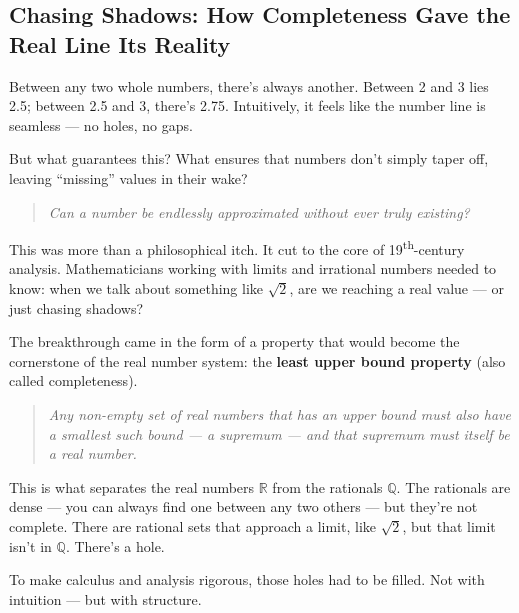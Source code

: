 \subsection{Chasing Shadows: How Completeness Gave the Real Line Its Reality}

Between any two whole numbers, there’s always another. Between 2 and 3 lies 2.5; between 2.5 and 3, there’s 2.75. Intuitively, it feels like the number line is seamless — no holes, no gaps.

But what guarantees this? What ensures that numbers don’t simply taper off, leaving “missing” values in their wake?

\medskip

\begin{quote}
    \textit{Can a number be endlessly approximated without ever truly existing?}
\end{quote}

This was more than a philosophical itch. It cut to the core of 19\textsuperscript{th}-century analysis. Mathematicians working with limits and irrational numbers needed to know: when we talk about something like \( \sqrt{2} \), are we reaching a real value — or just chasing shadows?

\medskip

The breakthrough came in the form of a property that would become the cornerstone of the real number system: the \textbf{least upper bound property} (also called completeness).

\begin{quote}
\textit{Any non-empty set of real numbers that has an upper bound must also have a smallest such bound — a supremum — and that supremum must itself be a real number.}
\end{quote}

This is what separates the real numbers \( \mathbb{R} \) from the rationals \( \mathbb{Q} \). The rationals are dense — you can always find one between any two others — but they’re not complete. There are rational sets that approach a limit, like \( \sqrt{2} \), but that limit isn’t in \( \mathbb{Q} \). There's a hole.

To make calculus and analysis rigorous, those holes had to be filled. Not with intuition — but with structure.
